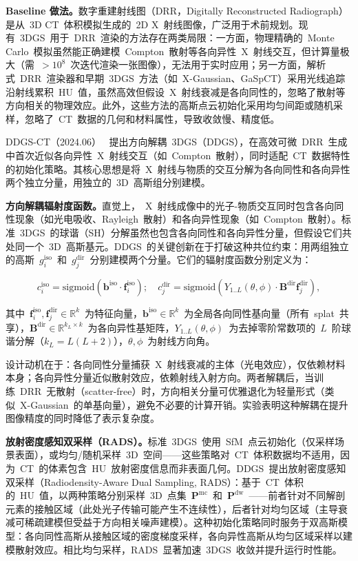 \textbf{Baseline 做法。}数字重建射线图（DRR，Digitally Reconstructed Radiograph）是从~3D CT~体积模拟生成的~2D X~射线图像，广泛用于术前规划。现有~3DGS~用于~DRR~渲染的方法存在两类局限：一方面，物理精确的~Monte Carlo~模拟虽然能正确建模~Compton~散射等各向异性~X~射线交互，但计算量极大（需~$>10^8$~次迭代渲染一张图像），无法用于实时应用；另一方面，解析式~DRR~渲染器和早期~3DGS~方法（如~X-Gaussian、GaSpCT）采用光线追踪沿射线累积~HU~值，虽然高效但假设~X~射线衰减是各向同性的，忽略了散射等方向相关的物理效应。此外，这些方法的高斯点云初始化采用均匀间距或随机采样，忽略了~CT~数据的几何和材料属性，导致收敛慢、精度低。

DDGS-CT（2024.06）~\cite{2406_02518} 提出方向解耦~3DGS（DDGS），在高效可微~DRR~生成中首次近似各向异性~X~射线交互（如~Compton~散射），同时适配~CT~数据特性的初始化策略。其核心思想是将~X~射线与物质的交互分解为各向同性和各向异性两个独立分量，用独立的~3D~高斯组分别建模。

\textbf{方向解耦辐射度函数。}直觉上，~X~射线成像中的光子-物质交互同时包含各向同性现象（如光电吸收、Rayleigh~散射）和各向异性现象（如~Compton~散射）。标准~3DGS~的球谐（SH）分解虽然也包含各向同性和各向异性分量，但假设它们共处同一个~3D~高斯基元。DDGS~的关键创新在于打破这种共位约束：用两组独立的高斯~$g_i^{\text{iso}}$~和~$g_j^{\text{dir}}$~分别建模两个分量。它们的辐射度函数分别定义为：

\begin{equation}
c_i^{\text{iso}} = \text{sigmoid}(\bm{b}^{\text{iso}} \cdot \bm{f}_i^{\text{iso}}); \quad c_j^{\text{dir}} = \text{sigmoid}(Y_{1..L}(\theta,\phi) \cdot \bm{B}^{\text{dir}} \bm{f}_j^{\text{dir}}),
\end{equation}

其中~$\bm{f}_i^{\text{iso}}, \bm{f}_j^{\text{dir}} \in \mathbb{R}^k$~为特征向量，$\bm{b}^{\text{iso}} \in \mathbb{R}^k$~为全局各向同性基向量（所有~splat~共享），$\bm{B}^{\text{dir}} \in \mathbb{R}^{k_L \times k}$~为各向异性基矩阵，$Y_{1..L}(\theta,\phi)$~为去掉零阶常数项的~$L$~阶球谐分解（$k_L = L(L+2)$），$\theta,\phi$~为射线方向角。

设计动机在于：各向同性分量捕获~X~射线衰减的主体（光电效应），仅依赖材料本身；各向异性分量近似散射效应，依赖射线入射方向。两者解耦后，当训练~DRR~无散射（scatter-free）时，方向相关分量可优雅退化为轻量形式（类似~X-Gaussian~的单基向量），避免不必要的计算开销。实验表明这种解耦在提升图像精度的同时降低了表示复杂度。

\textbf{放射密度感知双采样（RADS）。}标准~3DGS~使用~SfM~点云初始化（仅采样场景表面），或均匀/随机采样~3D~空间——这些策略对~CT~体积数据均不适用，因为~CT~的体素包含~HU~放射密度信息而非表面几何。DDGS~提出放射密度感知双采样（Radiodensity-Aware Dual Sampling, RADS）：基于~CT~体积的~HU~值，以两种策略分别采样~3D~点集~$\mathbf{P}^{\text{mc}}$~和~$\mathbf{P}^{\text{dw}}$~——前者针对不同解剖元素的接触区域（此处光子传输可能产生不连续性），后者针对均匀区域（主导衰减可稀疏建模但受益于方向相关噪声建模）。这种初始化策略同时服务于双高斯模型：各向同性高斯从接触区域的密度梯度采样，各向异性高斯从均匀区域采样以建模散射效应。相比均匀采样，RADS~显著加速~3DGS~收敛并提升运行时性能。

